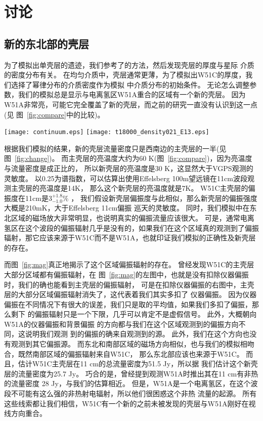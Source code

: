 \section{讨论}
\label{W51Cdis}
\subsection{新的东北部的壳层}
为了模拟出单壳层的遗迹，我们参考了\citet{Orlando2007}的方法，然后发现壳层的厚度与星际
介质的密度分布有关。
在均匀介质中，壳层通常更薄，为了模拟出W51C的厚度，我们选择了幂律分布的介质密度作为模拟
中介质分布的初始条件。
无论怎么调整参数，我们的模拟总是显示与电离氢区W51A重合的区域有一个新的壳层。
因为W51A非常亮，可能它完全覆盖了新的壳层，而之前的研究一直没有认识到这一点(见
图~\ref{fig:compare}中的比较)。

\begin{figure*}
   \centering
   \texttt{[image: continuum.eps]}
   \texttt{[image: t18000\_density021\_E13.eps]}
   \caption{左图显示了W51复合区的1420 MHz连续谱图。右图是图~\ref{fig:flux}右图，只是
   改变了颜色风格。取距离为4.3 kpc，两者有相同的大小。}
\label{fig:compare}
\end{figure*}

根据我们模拟的结果，新的壳层流量密度只是西南边的主壳层的一半(见图~\ref{fig:change})。
而主壳层的亮温度大约为60 K(图~\ref{fig:compare})，因为亮温度与流量密度是成正比的，
所以新壳层的亮温度是30 K，这显然大于VGPS观测的灵敏度。
以0.25为谱指数，可以估算出使用Effelsberg 100m望远镜在11cm波段观测主壳层的亮温度是14K，
那么这个新壳层的亮温度就是7K。
W51C主壳层的偏振度在11cm是3$^{+1.8}_{-1.0}\%$ \citep{1974A&A....32..375V}，
我们假设新壳层偏振度与此相似，那么新壳层的偏振强度大概是210mK，大于Effelsberg 11cm偏振
巡天的灵敏度。
同时，我们模拟中在东北区域的磁场放大非常明显，也说明真实的偏振流量应该很大。
可是，通常电离氢区在这个波段的偏振辐射几乎是没有的，如果我们在这个区域真的观测到了偏振
辐射，那它应该来源于W51C而不是W51A，也就印证我们模拟的正确性及新壳层的存在。

而图~\ref{fig:mag}真正地揭示了这个区域偏振辐射的存在。
\citet{1974A&A....32..375V}曾经发现W51C的主壳层大部分区域都有偏振辐射，在
图~\ref{fig:mag}的左图中，也就是没有扣除仪器偏振时，我们的确也能看到主壳层的偏振辐射，
可是在扣除仪器偏振的右图中，主壳层的大部分区域偏振辐射消失了，这代表着我们其实多扣了
仪器偏振。
因为仪器偏振在不同情况下有很大的误差，我们只是取的平均值，如果我们多扣了偏振，那么剩下
的偏振辐射只是一个下限，几乎可以肯定不是虚假信号。
此外，大概朝向W51A的仪器偏振\citep{1987A&AS...69..451J}和背景偏振
\citep{1999A&A...350..447D}的方向都与我们在这个区域观测到的偏振方向不同，这说明我们观测
到的偏振的确来自观测到的源。
此外，我们在这个方向也没有观测到其它偏振源\citep{Xu2014}。
而东北和南部区域的磁场方向相似，也与我们的模拟相吻合，既然南部区域的偏振辐射来自W51C，
那么东北部应该也来源于W51C。
而且，\citet{1974A&A....32..375V}估计W51C主壳层在11 cm的总流量密度为51.5 Jy，所以据
我们估计这个新壳层的流量密度为25.7 Jy。
巧合的是，\citet{1994JKAS...27...81M}曾经提到观测W51A时推出其在11 cm有非热的流量密度
28 Jy，与我们的估算相近。
但是，W51A是一个电离氢区，在这个波段不可能有这么强的非热射电辐射，所以他们很困惑这个非热
流量的起源。
所有这些线索都让我们相信，W51C有一个新的之前未被发现的壳层与W51A刚好在视线方向重合。

